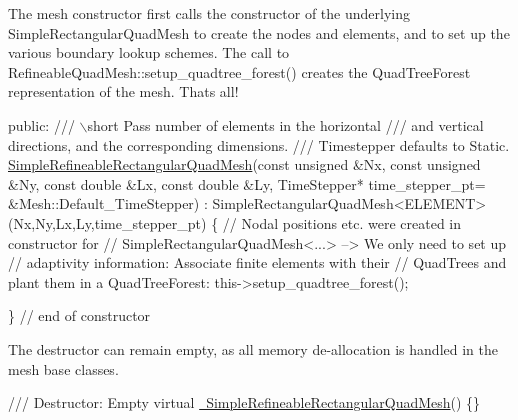 The mesh constructor first calls the constructor of the underlying {\ttfamily Simple\+Rectangular\+Quad\+Mesh} to create the nodes and elements, and to set up the various boundary lookup schemes. The call to {\ttfamily Refineable\+Quad\+Mesh\+::setup\+\_\+quadtree\+\_\+forest()} creates the {\ttfamily Quad\+Tree\+Forest} representation of the mesh. That\textquotesingle{}s all!


\begin{DoxyCodeInclude}
\textcolor{keyword}{public}: 
\textcolor{comment}{}
\textcolor{comment}{ /// \(\backslash\)short  Pass number of elements in the horizontal }
\textcolor{comment}{ /// and vertical directions, and the corresponding dimensions.}
\textcolor{comment}{ /// Timestepper defaults to Static.}
\textcolor{comment}{} \hyperlink{classSimpleRefineableRectangularQuadMesh_ae0eab85a2c97fce00d7c82a613378e79}{SimpleRefineableRectangularQuadMesh}(\textcolor{keyword}{const} \textcolor{keywordtype}{unsigned} &Nx,
                                     \textcolor{keyword}{const} \textcolor{keywordtype}{unsigned} &Ny, 
                                     \textcolor{keyword}{const} \textcolor{keywordtype}{double} &Lx, \textcolor{keyword}{const} \textcolor{keywordtype}{double} &Ly,
                                     TimeStepper* time\_stepper\_pt=
                                     &Mesh::Default\_TimeStepper) :
  SimpleRectangularQuadMesh<ELEMENT>(Nx,Ny,Lx,Ly,time\_stepper\_pt)
  \{
   \textcolor{comment}{// Nodal positions etc. were created in constructor for}
   \textcolor{comment}{// SimpleRectangularQuadMesh<...> --> We only need to set up }
   \textcolor{comment}{// adaptivity information: Associate finite elements with their }
   \textcolor{comment}{// QuadTrees and plant them in a QuadTreeForest:}
   this->setup\_quadtree\_forest();

  \} \textcolor{comment}{// end of constructor}

\end{DoxyCodeInclude}


The destructor can remain empty, as all memory de-\/allocation is handled in the mesh base classes.


\begin{DoxyCodeInclude}
 \textcolor{comment}{/// Destructor: Empty}
 \textcolor{keyword}{virtual} \hyperlink{classSimpleRefineableRectangularQuadMesh_a8f258e0b5178ccb33f0596ae5a33c3c5}{~SimpleRefineableRectangularQuadMesh}() \{\}

\end{DoxyCodeInclude}




